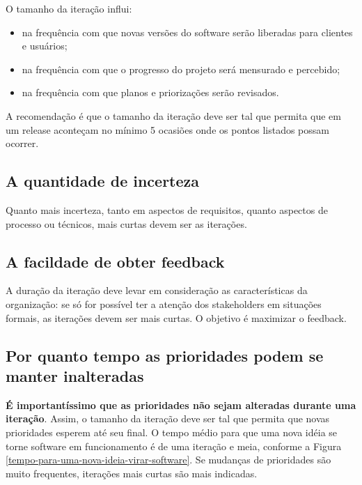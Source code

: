 \documentclass[a4paper,abntfigtabnum,noindentfirst]{abnt}
\begin{document}
O tamanho da iteração influi:
\begin{itemize}
 \item na frequência com que novas versões do software serão liberadas para clientes e usuários;
 \item na frequência com que o progresso do projeto será mensurado e percebido;
 \item na frequência com que planos e priorizações serão revisados.
\end{itemize}

A recomendação é que o tamanho da iteração deve ser tal que permita que em um release aconteçam no mínimo 5 ocasiões onde os pontos listados possam ocorrer.


\subsection{A quantidade de incerteza}

Quanto mais incerteza, tanto em aspectos de requisitos, quanto aspectos de processo ou técnicos, mais curtas devem ser as iterações.


\subsection{A facildade de obter feedback}

A duração da iteração deve levar em consideração as características da organização: se só for possível ter a atenção dos stakeholders em situações formais, as iterações devem ser mais curtas. O objetivo é maximizar o feedback.


\subsection{Por quanto tempo as prioridades podem se manter inalteradas}

\textbf{É importantíssimo que as prioridades não sejam alteradas durante uma iteração}. Assim, o tamanho da iteração deve ser tal que permita que novas prioridades esperem até seu final. O tempo médio para que uma nova idéia se torne software em funcionamento é de uma iteração e meia, conforme a Figura \ref{tempo-para-uma-nova-ideia-virar-software}. Se mudanças de prioridades são muito frequentes, iterações mais curtas são mais indicadas. 
\end{document}
